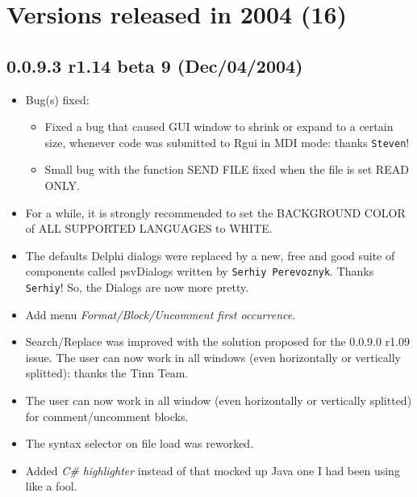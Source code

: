 
\section{Versions released in 2004 (16)}
\subsection*{0.0.9.3 r1.14 beta 9 (Dec/04/2004)}
\begin{itemize}
  \item Bug(s) fixed:
    \begin{itemize}
      \item Fixed a bug that caused \RR{} GUI window to shrink or expand to a certain size,
        whenever code was submitted to Rgui in MDI mode: thanks \texttt{Steven}!
      \item Small bug with the function SEND FILE fixed when the file is set READ ONLY.
    \end{itemize}
  \item For a while, it is strongly recommended to set the BACKGROUND COLOR of ALL SUPPORTED LANGUAGES to WHITE.
  \item The defaults Delphi dialogs were replaced by a new, free and good suite of components called psvDialogs
    written by \texttt{Serhiy Perevoznyk}. Thanks \texttt{Serhiy}! So, the Dialogs are now more pretty.
  \item Add menu \textit{Format/Block/Uncomment first occurrence}.
  \item Search/Replace was improved with the solution proposed for the 0.0.9.0 r1.09 issue. The user can now work
    in all windows (even horizontally or vertically splitted): thanks the Tinn Team.
  \item The user can now work in all window (even horizontally or vertically splitted) for comment/uncomment blocks.
  \item The syntax selector on file load was reworked.
  \item Added \textit{C\# highlighter} instead of that mocked up Java one I had been using like a fool.
\end{itemize}


